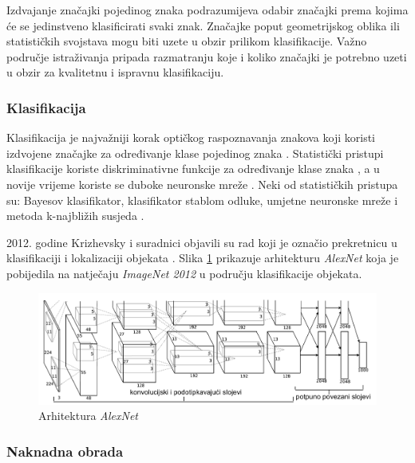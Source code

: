 \documentclass[times, utf8, zavrsni]{fer}
\begin{document}
Izdvajanje značajki pojedinog znaka podrazumijeva odabir značajki prema kojima će
se jedinstveno klasificirati svaki znak. Značajke poput geometrijskog oblika ili
statističkih svojstava mogu biti uzete u obzir prilikom klasifikacije. Važno područje istraživanja pripada
razmatranju koje i koliko značajki je potrebno uzeti u obzir za kvalitetnu i ispravnu
klasifikaciju. \citep{DBLP:journals/corr/abs-1710-05703}

\subsubsection{Klasifikacija}

Klasifikacija je najvažniji korak optičkog raspoznavanja znakova \citep{verma2012survey} \citep{zhu2016novel}
koji koristi izdvojene značajke za određivanje klase pojedinog znaka \citep{lehal1999feature} \citep{kaur2016survey}.
Statistički pristupi klasifikacije koriste diskriminativne funkcije za određivanje klase znaka \citep{DBLP:journals/corr/abs-1710-05703},
a u novije vrijeme koriste se duboke neuronske mreže \citep{Jurin:2017:Master}.
Neki od statističkih pristupa su: Bayesov klasifikator, klasifikator stablom odluke, umjetne neuronske mreže i
metoda k-najbližih susjeda \citep{DBLP:journals/corr/abs-1710-05703}.

2012. godine Krizhevsky i suradnici \citep{krizhevsky2012imagenet} objavili su rad koji je
označio prekretnicu u klasifikaciji i lokalizaciji objekata \citep{Jurin:2017:Master}. Slika
\ref{fig:deep-example-01} prikazuje arhitekturu \emph{AlexNet} koja je pobijedila na natječaju
\emph{ImageNet 2012} u području klasifikacije objekata. \citep{Jurin:2017:Master}

\begin{figure}[htb]
    \centering
    \includegraphics[width=\textwidth]{images/deep-example-01.png}
    \caption{Arhitektura \emph{AlexNet} \citep{Jurin:2017:Master}}
    \label{fig:deep-example-01}
\end{figure}

\subsubsection{Naknadna obrada}
\end{document}
